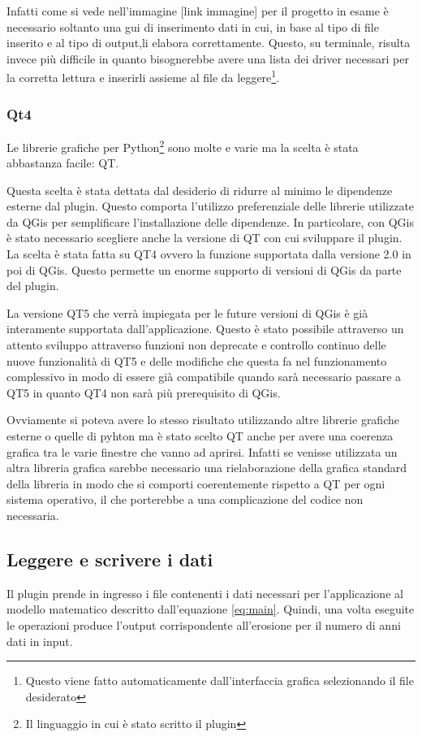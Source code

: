 
Infatti come si vede nell'immagine [link immagine] per il progetto in esame è necessario soltanto una gui di inserimento dati in cui, in base al tipo di file inserito e al tipo di output,li elabora correttamente. Questo, su terminale, risulta invece più difficile in quanto bisognerebbe avere una lista dei driver necessari per la corretta lettura e inserirli assieme al file da leggere\footnote{Questo viene fatto automaticamente dall'interfaccia grafica selezionando il file desiderato}.

\subsubsection{Qt4}

Le librerie grafiche per Python\footnote{Il linguaggio in cui è stato scritto il plugin} sono molte e varie ma la scelta è stata abbastanza facile: QT.

Questa scelta è stata dettata dal desiderio di ridurre al minimo le dipendenze esterne dal plugin. Questo comporta l'utilizzo preferenziale delle librerie utilizzate da QGis per semplificare l'installazione delle dipendenze. In particolare, con QGis è stato necessario scegliere anche la versione di QT con cui sviluppare il plugin. La scelta è stata fatta su QT4 ovvero la funzione supportata dalla versione 2.0 in poi di QGis.  Questo permette un enorme supporto di versioni di QGis da parte del plugin.

La versione QT5 che verrà impiegata per le future versioni di QGis è già interamente supportata dall'applicazione. Questo è stato possibile attraverso un attento sviluppo attraverso funzioni non deprecate e controllo continuo delle nuove funzionalità di QT5 e delle modifiche che questa fa nel funzionamento complessivo in modo di essere già compatibile quando sarà necessario passare a QT5 in quanto QT4 non sarà più prerequisito di QGis.

Ovviamente si poteva avere lo stesso risultato utilizzando altre librerie grafiche esterne o quelle di pyhton ma è stato scelto QT anche per avere una coerenza grafica tra le varie finestre che vanno ad aprirsi. Infatti se venisse utilizzata un altra libreria grafica sarebbe necessario una rielaborazione della grafica standard della libreria in modo che si comporti coerentemente rispetto a QT per ogni sistema operativo, il che porterebbe a una complicazione del codice non necessaria.

\subsection{Leggere e scrivere i dati}
Il plugin prende in ingresso i file contenenti i dati necessari per l'applicazione al modello matematico descritto dall'equazione \ref{eq:main}. Quindi, una volta eseguite le operazioni produce l'output corrispondente all'erosione per il numero di anni dati in input.

